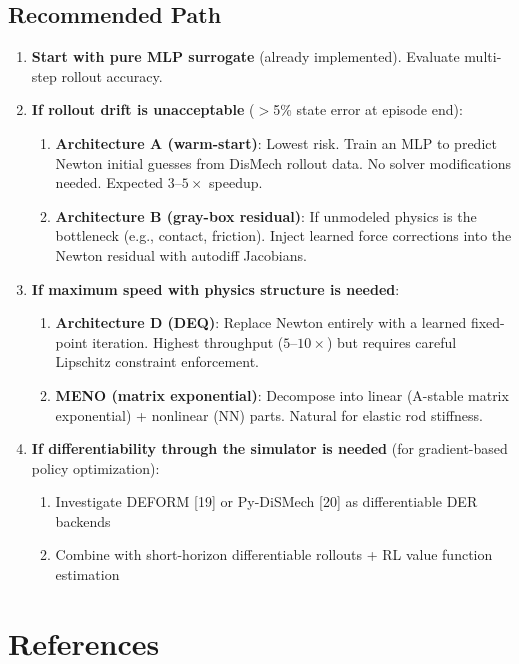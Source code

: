 \documentclass[11pt]{article}
\begin{document}
\subsection{Recommended Path}

\begin{enumerate}
  \item \textbf{Start with pure MLP surrogate} (already implemented).  Evaluate multi-step rollout accuracy.
  \item \textbf{If rollout drift is unacceptable} ($>$5\% state error at episode end):
    \begin{enumerate}[label=(\alph*)]
      \item \textbf{Architecture A (warm-start)}: Lowest risk.  Train an MLP to predict Newton initial guesses from DisMech rollout data.  No solver modifications needed.  Expected $3$--$5\times$ speedup.
      \item \textbf{Architecture B (gray-box residual)}: If unmodeled physics is the bottleneck (e.g., contact, friction).  Inject learned force corrections into the Newton residual with autodiff Jacobians.
    \end{enumerate}
  \item \textbf{If maximum speed with physics structure is needed}:
    \begin{enumerate}[label=(\alph*)]
      \item \textbf{Architecture D (DEQ)}: Replace Newton entirely with a learned fixed-point iteration.  Highest throughput ($5$--$10\times$) but requires careful Lipschitz constraint enforcement.
      \item \textbf{MENO (matrix exponential)}: Decompose into linear (A-stable matrix exponential) + nonlinear (NN) parts.  Natural for elastic rod stiffness.
    \end{enumerate}
  \item \textbf{If differentiability through the simulator is needed} (for gradient-based policy optimization):
    \begin{enumerate}[label=(\alph*)]
      \item Investigate DEFORM [19] or Py-DiSMech [20] as differentiable DER backends
      \item Combine with short-horizon differentiable rollouts + RL value function estimation
    \end{enumerate}
\end{enumerate}


\section*{References}
\end{document}
